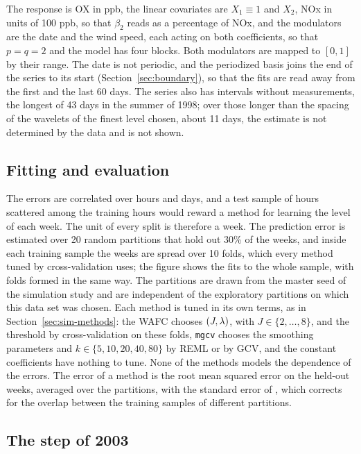 The response is OX in ppb, the linear covariates are $X_1 \equiv 1$ and
$X_2$, NOx in units of 100 ppb, so that $\beta_2$ reads as a percentage of
NOx, and the modulators are the date and the wind speed, each acting on both
coefficients, so that $p = q = 2$ and the model has four blocks. Both
modulators are mapped to $[0,1]$ by their range. The date is not periodic, and
the periodized basis joins the end of the series to its start
(Section~\ref{sec:boundary}), so that the fits are read away from the first
and the last 60 days. The series also has intervals without measurements,
the longest of 43 days in the summer of 1998; over those longer than the
spacing of the wavelets of the finest level chosen, about 11 days, the
estimate is not determined by the data and is not shown.

\subsection{Fitting and evaluation}
\label{sec:app-fit}

The errors are correlated over hours and days, and a test sample of hours
scattered among the training hours would reward a method for learning the
level of each week. The unit of every split is therefore a week. The
prediction error is estimated over 20 random partitions that hold out 30\% of
the weeks, and inside each training sample the weeks are spread over 10
folds, which every method tuned by cross-validation uses; the figure shows
the fits to the whole sample, with folds formed in the same way. The
partitions are drawn from the master seed of the simulation study and are
independent of the exploratory partitions on which this data set was chosen.
Each method is tuned in its own terms, as in Section~\ref{sec:sim-methods}:
the WAFC chooses $(J,\lambda)$, with $J \in \{2,\dots,8\}$, and the threshold by
cross-validation on these folds, \texttt{mgcv} chooses the smoothing
parameters and $k \in \{5,10,20,40,80\}$ by REML or by GCV, and the constant
coefficients have nothing to tune. None of the methods models the dependence
of the errors. The error of a method is the root mean squared error on the
held-out weeks, averaged over the partitions, with the standard error of
\citet{Nadeau-Bengio-2003}, which corrects for the overlap between the
training samples of different partitions.

\subsection{The step of 2003}
\label{sec:app-step}

